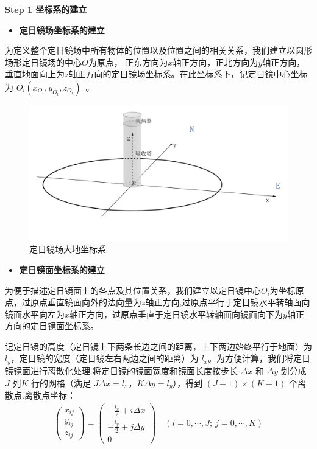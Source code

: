 \documentclass[../main.tex]{subfiles}
\begin{document}
\noindent \textbf{Step 1 坐标系的建立}

\begin{itemize}
\item \textbf{定日镜场坐标系的建立}
\end{itemize}

\par 为定义整个定日镜场中所有物体的位置以及位置之间的相关关系，我们建立以圆形场形定日镜场的中心$O$为原点，  
正东方向为$x$轴正方向，正北方向为$y$轴正方向，垂直地面向上为$z$轴正方向的定日镜场坐标系。在此坐标系下，记定日镜中心坐标为 \( O_i(x_{O_i}, y_{O_i}, z_{O_i}) \) 。 
  \begin{figure}[H]
    \centering
    \includegraphics[width=.6\textwidth]{1}
    \caption{定日镜场大地坐标系}
    \label{1.1}
\end{figure}
    \begin{itemize}
  \item \textbf{定日镜面坐标系的建立}
  \end{itemize}
\par 为便于描述定日镜面上的各点及其位置关系，我们建立以定日镜中心$O_i$为坐标原点，过原点垂直镜面向外的法向量为$z$轴正方向,过原点平行于定日镜水平转轴面向镜面水平向左为$x$轴正方向，过原点垂直于定日镜水平转轴面向镜面向下为$y$轴正方向的定日镜面坐标系。
\par 记定日镜的高度（定日镜上下两条长边之间的距离，上下两边始终平行于地面）为 $l_y$，定日镜的宽度（定日镜左右两边之间的距离）为 $l_x$。为方便计算，我们将定日镜镜面进行离散化处理.将定日镜的镜面宽度和镜面长度按步长 $\Delta x$ 和 $\Delta y$ 划分成 $J$ 列$K$ 行的网格（满足 $J\Delta x = l_x$，$K\Delta y = l_y$），得到 $(J + 1) \times (K + 1)$ 个离散点.离散点坐标：
\begin{align}\label{3.88}
  \begin{pmatrix}
x_{ij} \\
y_{ij} \\
z_{ij}
\end{pmatrix}
=
\begin{pmatrix}
-\frac{l_x}{2} + i\Delta x \\
-\frac{l_y}{2} + j\Delta y \\
0
\end{pmatrix}
\quad (i = 0, \cdots, J; \ j = 0, \cdots, K)
\end{align}
\end{document}
